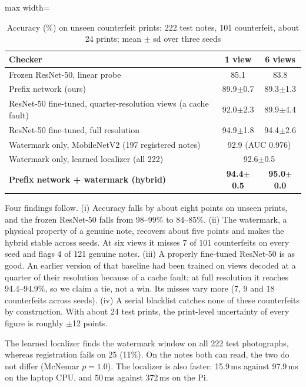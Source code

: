 \documentclass[preprint,12pt]{elsarticle}
\begin{document}
\begin{table}[!htbp]
\caption{Accuracy (\%) on unseen counterfeit prints: 222 test notes, 101 counterfeit, about 24 prints; mean $\pm$ sd over three seeds}
\label{tab:unseen}
\centering\small
\begin{adjustbox}{max width=\textwidth}\begin{tabular}{@{}lcc@{}}
\toprule
Checker & 1 view & 6 views \\ \midrule
Frozen ResNet-50, linear probe & 85.1 & 83.8 \\
Prefix network (ours) & 89.9$\pm$0.7 & 89.3$\pm$1.3 \\
ResNet-50 fine-tuned, quarter-resolution views (a cache fault) & 92.0$\pm$2.3 & 89.9$\pm$4.4 \\
ResNet-50 fine-tuned, full resolution & 94.9$\pm$1.8 & 94.4$\pm$2.6 \\
Watermark only, MobileNetV2 (197 registered notes) & \multicolumn{2}{c}{92.9 (AUC 0.976)} \\
Watermark only, learned localizer (all 222) & \multicolumn{2}{c}{92.6$\pm$0.5} \\
\textbf{Prefix network + watermark (hybrid)} & \textbf{94.4$\pm$0.5} & \textbf{95.0$\pm$0.0} \\ \bottomrule
\end{tabular}\end{adjustbox}
\end{table}

Four findings follow. (i) Accuracy falls by about eight points on unseen prints, and the frozen ResNet-50 falls from 98--99\% to 84--85\%. (ii) The watermark, a physical property of a genuine note, recovers about five points and makes the hybrid stable across seeds. At six views it misses 7 of 101 counterfeits on every seed and flags 4 of 121 genuine notes. (iii) A properly fine-tuned ResNet-50 is as good. An earlier version of that baseline had been trained on views decoded at a quarter of their resolution because of a cache fault; at full resolution it reaches 94.4--94.9\%, so we claim a tie, not a win. Its misses vary more (7, 9 and 18 counterfeits across seeds). (iv) A serial blacklist catches none of these counterfeits by construction. With about 24 test prints, the print-level uncertainty of every figure is roughly $\pm$12 points.

The learned localizer finds the watermark window on all 222 test photographs, whereas registration fails on 25 (11\%). On the notes both can read, the two do not differ (McNemar $p=1.0$). The localizer is also faster: 15.9\,ms against 97.9\,ms on the laptop CPU, and 50\,ms against 372\,ms on the Pi.
\end{document}
